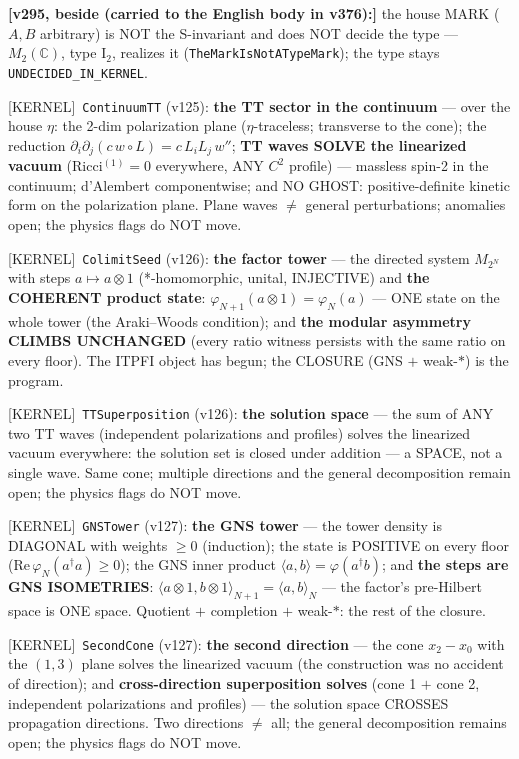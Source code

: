 \documentclass[11pt]{article}
\providecommand{\kernelmk}[1]{\textsf{[KERNEL]}~\texttt{#1}}\providecommand{\knownmk}[1]{\textsf{[KNOWN]}~{#1}}\providecommand{\statusmk}[1]{\textsf{[#1]}}
\theoremstyle{definition}\newtheorem{deriv}{Derivation}
\begin{document}
\textbf{[v295, beside (carried to the English body in v376):]} the house MARK ($A,B$ arbitrary) is NOT the S-invariant and does NOT decide the type --- $M_2(\mathbb{C})$, type I$_2$, realizes it (\texttt{TheMarkIsNotATypeMark}); the type stays \texttt{UNDECIDED\_IN\_KERNEL}.

\kernelmk{ContinuumTT} (v125): \textbf{the TT sector in the continuum} --- over the house $\eta$: the 2-dim polarization plane ($\eta$-traceless; transverse to the cone); the reduction $\partial_i\partial_j(c\,w{\circ}L)=c\,L_iL_j\,w''$; \textbf{TT waves SOLVE the linearized vacuum} (Ricci$^{(1)}=0$ everywhere, ANY $C^2$ profile) --- massless spin-2 in the continuum; d'Alembert componentwise; and NO GHOST: positive-definite kinetic form on the polarization plane. Plane waves $\neq$ general perturbations; anomalies open; the physics flags do NOT move.

\kernelmk{ColimitSeed} (v126): \textbf{the factor tower} --- the directed system $M_{2^N}$ with steps $a\mapsto a\otimes 1$ (*-homomorphic, unital, INJECTIVE) and \textbf{the COHERENT product state}: $\varphi_{N+1}(a\otimes 1)=\varphi_N(a)$ --- ONE state on the whole tower (the Araki--Woods condition); and \textbf{the modular asymmetry CLIMBS UNCHANGED} (every ratio witness persists with the same ratio on every floor). The ITPFI object has begun; the CLOSURE (GNS $+$ weak-$*$) is the program.

\kernelmk{TTSuperposition} (v126): \textbf{the solution space} --- the sum of ANY two TT waves (independent polarizations and profiles) solves the linearized vacuum everywhere: the solution set is closed under addition --- a SPACE, not a single wave. Same cone; multiple directions and the general decomposition remain open; the physics flags do NOT move.

\kernelmk{GNSTower} (v127): \textbf{the GNS tower} --- the tower density is DIAGONAL with weights $\geq 0$ (induction); the state is POSITIVE on every floor ($\mathrm{Re}\,\varphi_N(a^\dagger a)\geq 0$); the GNS inner product $\langle a,b\rangle=\varphi(a^\dagger b)$; and \textbf{the steps are GNS ISOMETRIES}: $\langle a\otimes1,b\otimes1\rangle_{N+1}=\langle a,b\rangle_N$ --- the factor's pre-Hilbert space is ONE space. Quotient $+$ completion $+$ weak-$*$: the rest of the closure.

\kernelmk{SecondCone} (v127): \textbf{the second direction} --- the cone $x_2{-}x_0$ with the $(1,3)$ plane solves the linearized vacuum (the construction was no accident of direction); and \textbf{cross-direction superposition solves} (cone 1 $+$ cone 2, independent polarizations and profiles) --- the solution space CROSSES propagation directions. Two directions $\neq$ all; the general decomposition remains open; the physics flags do NOT move.
\end{document}
